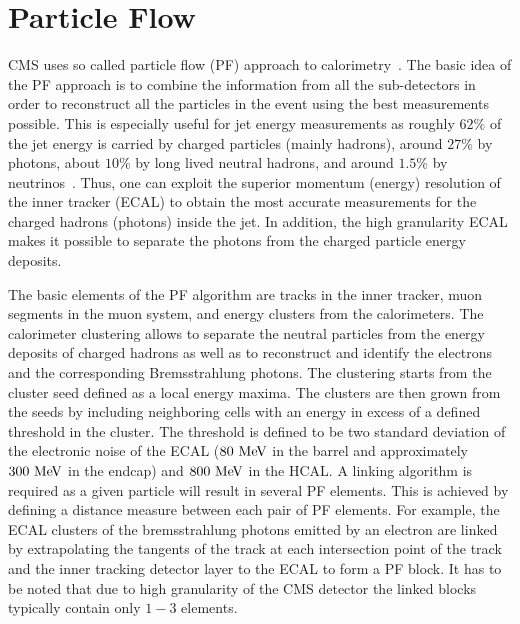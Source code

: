 \section{Particle Flow}

CMS uses so called particle flow (PF) approach to calorimetry~\cite{CMS-PAS-PFT-09-001,CMS-PAS-PFT-10-001,CMS-PAS-PFT-10-002}.  The basic idea of the PF approach is to combine the information from all the sub-detectors in order to reconstruct all the particles in the event using the best measurements possible. This is especially useful for jet energy measurements as roughly $62\%$ of the jet energy is carried by charged particles (mainly hadrons), around $27\%$ by photons, about $10\%$ by long lived neutral hadrons, and around $1.5\%$ by neutrinos~\cite{Thomson200925}. Thus, one can exploit the superior momentum (energy) resolution of the inner tracker (ECAL) to obtain the most accurate measurements for the charged hadrons (photons) inside the jet. In addition, the high granularity ECAL makes it possible to separate the photons from the charged particle energy deposits. 

 The basic elements of the PF algorithm are tracks in the inner tracker, muon segments in the muon system, and energy clusters from the calorimeters. The calorimeter clustering allows to separate the neutral particles from the energy deposits of charged hadrons as well as to reconstruct and identify the electrons and the corresponding Bremsstrahlung photons. The clustering starts from the cluster seed defined as a local energy maxima. The clusters are then grown from the seeds by including neighboring cells with an energy in excess of a defined threshold in the cluster. The threshold is defined to be two standard deviation of the electronic noise of the ECAL ($80~\mathrm{Me\kern -0.1em V}$ in the barrel and  approximately $300~\mathrm{Me\kern -0.1em V}$ in the endcap) and $800~\mathrm{Me\kern -0.1em V}$ in the HCAL. A linking algorithm is required as a given particle will result in several PF elements. This is achieved by defining a distance measure between each pair of PF elements. For example, the ECAL clusters of the bremsstrahlung photons emitted by an electron are linked by extrapolating the tangents of the track at each intersection point of the track and the inner tracking detector layer to the ECAL to form a PF block. It has to be noted that due to high granularity of the CMS detector the linked blocks typically contain only $1-3$ elements. 
 
